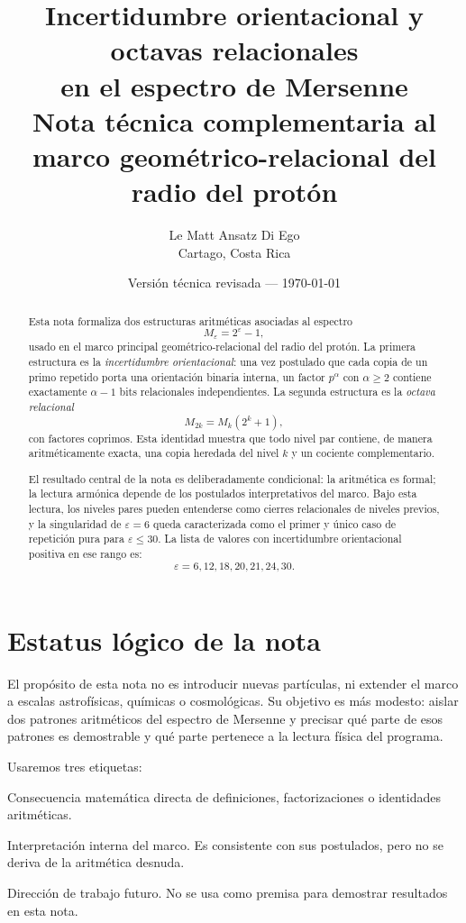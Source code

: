 \documentclass[11pt]{article}
\title{\textbf{Incertidumbre orientacional y octavas relacionales}\\
en el espectro de Mersenne\\[2mm]
\large Nota técnica complementaria al marco geométrico-relacional del radio del protón}
\author{Le Matt Ansatz Di Ego\\
\small Cartago, Costa Rica}
\date{Versión técnica revisada --- \today}
\begin{document}
\maketitle

\begin{abstract}
\noindent
Esta nota formaliza dos estructuras aritméticas asociadas al espectro
\[
M_{\varepsilon}=2^{\varepsilon}-1,
\]
usado en el marco principal geométrico-relacional del radio del protón. 
La primera estructura es la \emph{incertidumbre orientacional}: una vez postulado que cada copia de un primo repetido porta una orientación binaria interna, un factor $p^\alpha$ con $\alpha\geq2$ contiene exactamente $\alpha-1$ bits relacionales independientes. La segunda estructura es la \emph{octava relacional}
\[
M_{2k}=M_k(2^k+1),
\]
con factores coprimos. Esta identidad muestra que todo nivel par contiene, de manera aritméticamente exacta, una copia heredada del nivel $k$ y un cociente complementario.

El resultado central de la nota es deliberadamente condicional: la aritmética es formal; la lectura armónica depende de los postulados interpretativos del marco. Bajo esta lectura, los niveles pares pueden entenderse como cierres relacionales de niveles previos, y la singularidad de $\varepsilon=6$ queda caracterizada como el primer y único caso de repetición pura para $\varepsilon\leq30$. La lista de valores con incertidumbre orientacional positiva en ese rango es:
\[
\varepsilon=6,12,18,20,21,24,30.
\]
\end{abstract}

\clearpage
\section{Estatus lógico de la nota}

El propósito de esta nota no es introducir nuevas partículas, ni extender el marco a escalas astrofísicas, químicas o cosmológicas. Su objetivo es más modesto: aislar dos patrones aritméticos del espectro de Mersenne y precisar qué parte de esos patrones es demostrable y qué parte pertenece a la lectura física del programa.

Usaremos tres etiquetas:

\begin{description}[leftmargin=2.4cm,style=nextline]
\item[Formal.]
Consecuencia matemática directa de definiciones, factorizaciones o identidades aritméticas.

\item[Armónica.]
Interpretación interna del marco. Es consistente con sus postulados, pero no se deriva de la aritmética desnuda.

\item[Programática.]
Dirección de trabajo futuro. No se usa como premisa para demostrar resultados en esta nota.
\end{description}
\end{document}
